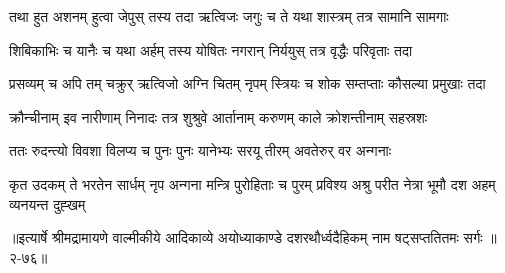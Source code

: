 \twolineshloka
{तथा हुत अशनम् हुत्वा जेपुस् तस्य तदा ऋत्विजः}
{जगुः च ते यथा शास्त्रम् तत्र सामानि सामगाः} %

\twolineshloka
{शिबिकाभिः च यानैः च यथा अर्हम् तस्य योषितः}
{नगरान् निर्ययुस् तत्र वृद्धैः परिवृताः तदा} %

\twolineshloka
{प्रसव्यम् च अपि तम् चक्रुर् ऋत्विजो अग्नि चितम् नृपम्}
{स्त्रियः च शोक सम्तप्ताः कौसल्या प्रमुखाः तदा} %

\twolineshloka
{क्रौन्चीनाम् इव नारीणाम् निनादः तत्र शुश्रुवे}
{आर्तानाम् करुणम् काले क्रोशन्तीनाम् सहस्रशः} %

\twolineshloka
{ततः रुदन्त्यो विवशा विलप्य च पुनः पुनः}
{यानेभ्यः सरयू तीरम् अवतेरुर् वर अन्गनाः} %

\fourlineindentedshloka
{कृत उदकम् ते भरतेन सार्धम्}
{नृप अन्गना मन्त्रि पुरोहिताः च}
{पुरम् प्रविश्य अश्रु परीत नेत्रा}
{भूमौ दश अहम् व्यनयन्त दुह्खम्} %


॥इत्यार्षे श्रीमद्रामायणे वाल्मीकीये आदिकाव्ये अयोध्याकाण्डे दशरथौर्ध्वदैहिकम् नाम षट्सप्ततितमः सर्गः ॥२-७६॥
